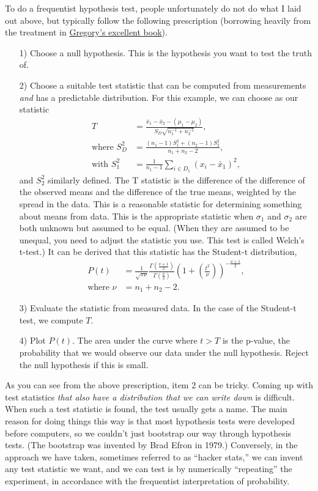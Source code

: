 To do a frequentist hypothesis test, people unfortunately do not do what I laid out above, but typically follow the following prescription (borrowing heavily from the treatment in \href{http://www.cambridge.org/us/academic/subjects/statistics-probability/statistics-physical-sciences-and-engineering/bayesian-logical-data-analysis-physical-sciences-comparative-approach-mathematica-support}{Gregory's excellent book}). \begin{itemize}
\item[1)] Choose a null hypothesis.  This is the hypothesis you want to test the truth of.
\item[2)] Choose a suitable test statistic that can be computed from measurements \textit{and} has a predictable distribution. For this example, we can choose as our statistic
\begin{align}
T &= \frac{\bar{x}_1 - \bar{x}_2 - (\mu_1 - \mu_2)}{S_D\sqrt{n_1^{-1}+n_2^{-1}}},\nonumber \\
\text{where }S_D^2 &= \frac{(n_1 - 1)S_1^2 + (n_2-1)S_2^2}{n_1+n_2-2}, \nonumber \\
\text{with } S_1^2 &= \frac{1}{n_1-1}\sum_{i\in D_1}(x_i - \bar{x}_1)^2,
\end{align}
and $S_2^2$ similarly defined.  The T statistic is the difference of the difference of the observed means and the difference of the true means, weighted by the spread in the data.  This is a reasonable statistic for determining something about means from data.  This is the appropriate statistic when $\sigma_1$ and $\sigma_2$ are both unknown but assumed to be equal.  (When they are assumed to be unequal, you need to adjust the statistic you use.  This test is called Welch's t-test.) It can be derived that this statistic has the Student-t distribution,
\begin{align}
P(t) &= \frac{1}{\sqrt{\pi \nu}} \frac{\Gamma\left(\frac{\nu+1}{2}\right)}{\Gamma\left(\frac{\nu}{2}\right)}
\left(1 + \left(\frac{t^2}{\nu}\right)\right)^{-\frac{\nu + 1}{2}},\\
\text{where } \nu &= n_1+n_2-2.
\end{align}
\item[3)] Evaluate the statistic from measured data.  In the case of the Student-t test, we compute $T$.
\item[4)] Plot $P(t)$.  The area under the curve where $t > T$ is the p-value, the probability that we would observe our data under the null hypothesis.  Reject the null hypothesis if this is small.
\end{itemize}
As you can see from the above prescription, item 2 can be tricky.  Coming up with test statistics \textit{that also have a distribution that we can write down} is difficult.  When such a test statistic is found, the test usually gets a name. The main reason for doing things this way is that most hypothesis tests were developed before computers, so we couldn't just bootstrap our way through hypothesis tests. (The bootstrap was invented by Brad Efron in 1979.) Conversely, in the approach we have taken, sometimes referred to as ``hacker stats,'' we can invent any test statistic we want, and we can test is by numerically ``repeating'' the experiment, in accordance with the frequentist interpretation of probability.

